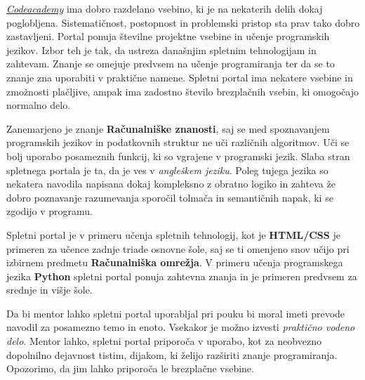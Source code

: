 \emph{\href{https://www.codecademy.com/}{Codeacademy}}
\cite{web:codeacademy} ima dobro razdelano vsebino, ki je na nekaterih
delih dokaj poglobljena. Sistematičnost, postopnost in problemski
pristop sta prav tako dobro zastavljeni. Portal ponuja številne
projektne vsebine in učenje programskih jezikov. Izbor teh je tak, da
ustreza današnjim spletnim tehnologijam in zahtevam. Znanje se omejuje
predvsem na učenje programiranja ter da se to znanje zna uporabiti v
praktične namene. Spletni portal ima nekatere vsebine in zmožnosti
plačljive, ampak ima zadostno število brezplačnih vsebin, ki omogočajo
normalno delo.

Zanemarjeno je znanje \textbf{Računalniške znanosti}, saj se med
spoznavanjem programskih jezikov in podatkovnih struktur ne uči
različnih algoritmov. Uči se bolj uporabo posameznih funkcij, ki so
vgrajene v programski jezik. Slaba stran spletnega portala je ta, da
je ves v \emph{angleškem jeziku}. Poleg tujega jezika so nekatera
navodila napisana dokaj kompleksno z obratno logiko in zahteva že
dobro poznavanje razumevanja sporočil tolmača in semantičnih napak, ki
se zgodijo v programu.


Spletni portal je v primeru učenja spletnih tehnologij, kot je
\textbf{HTML/CSS} je primeren za učence zadnje triade osnovne šole,
saj se ti omenjeno snov učijo pri izbirnem predmetu
\textbf{Računalniška omrežja}. V primeru učenja programskega jezika
\textbf{Python} spletni portal ponuja zahtevna znanja in je primeren
predvsem za srednje in višje šole.

Da bi mentor lahko spletni portal uporabljal pri pouku bi moral imeti
prevode navodil za posamezno temo in enoto. Vsekakor je možno izvesti
\emph{praktično vodeno delo}. Mentor lahko, spletni portal priporoča v
uporabo, kot za neobvezno dopolnilno dejavnost tistim, dijakom, ki
želijo razširiti znanje programiranja. Opozorimo, da jim lahko
priporoča le brezplačne vsebine.


